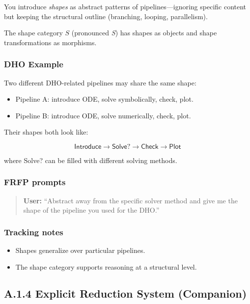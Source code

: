 You introduce \emph{shapes} as abstract patterns of pipelines---ignoring specific content but keeping
the structural outline (branching, looping, parallelism).

The shape category $S$ (pronounced \emph{S}) has shapes as objects and shape transformations as
morphisms.

\subsubsection*{DHO Example}

Two different DHO-related pipelines may share the same shape:

\begin{itemize}
 \item Pipeline A: introduce ODE, solve symbolically, check, plot.
 \item Pipeline B: introduce ODE, solve numerically, check, plot.
\end{itemize}

Their shapes both look like:

\[
\textsf{Introduce} \to \textsf{Solve}? \to \textsf{Check} \to \textsf{Plot}
\]

where \textsf{Solve}? can be filled with different solving methods.

\subsubsection*{FRFP prompts}

\begin{quote}
\textbf{User:} 
``Abstract away from the specific solver method and give me the shape of the pipeline you used for the DHO.'' 
\end{quote}

\subsubsection*{Tracking notes}

\begin{itemize}
 \item Shapes generalize over particular pipelines.
 \item The shape category supports reasoning at a structural level.
\end{itemize}

\newpage

\subsection{A.1.4 Explicit Reduction System (Companion)}

